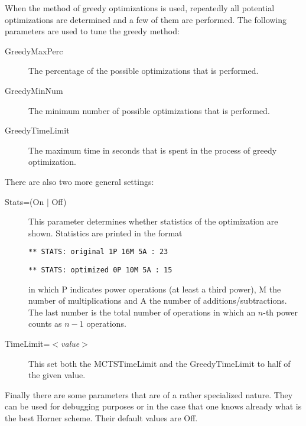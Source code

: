 When the method of greedy optimizations is used, repeatedly all
potential optimizations are determined and a few of them are performed. The 
following parameters are used to tune the greedy method:
\begin{description}
\item[GreedyMaxPerc] The percentage of the possible optimizations that is
  performed.
\item[GreedyMinNum] The minimum number of possible optimizations that
  is performed.
\item[GreedyTimeLimit] The maximum time in seconds that is spent in
  the process of greedy optimization.
\end{description}

There are also two more general settings:
\begin{description}
\item[Stats=(On $|$ Off)] This parameter determines whether statistics
  of the optimization are shown. Statistics are printed in the format

{\tt *** STATS: original  1P 16M 5A : 23}

{\tt *** STATS: optimized 0P 10M 5A : 15}

in which P indicates power operations (at least a third power), M the 
number of multiplications and A the number of additions/subtractions. The 
last number is the total number of operations in which an $n$-th power counts 
as $n-1$ operations.
\item[TimeLimit=$<$\emph{value}$>$] This set both the MCTSTimeLimit
  and the GreedyTimeLimit to half of the given value.
\end{description}

Finally there are some parameters that are of a rather specialized nature. 
They can be used for debugging purposes or in the case 
that one knows already what is the best Horner scheme. Their default values 
are Off.

